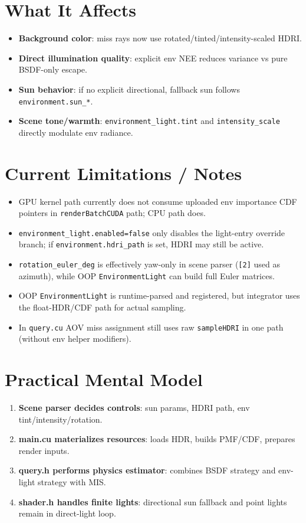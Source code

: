 \documentclass[11pt]{article}
\begin{document}
\section{What It Affects}
\begin{itemize}[leftmargin=1.5em]
  \item \textbf{Background color}: miss rays now use rotated/tinted/intensity-scaled HDRI.
  \item \textbf{Direct illumination quality}: explicit env NEE reduces variance vs pure BSDF-only escape.
  \item \textbf{Sun behavior}: if no explicit directional, fallback sun follows \verb|environment.sun_*|.
  \item \textbf{Scene tone/warmth}: \verb|environment_light.tint| and \verb|intensity_scale| directly modulate env radiance.
\end{itemize}

\section{Current Limitations / Notes}
\begin{itemize}[leftmargin=1.5em]
  \item GPU kernel path currently does not consume uploaded env importance CDF pointers in \verb|renderBatchCUDA| path; CPU path does.
  \item \verb|environment_light.enabled=false| only disables the light-entry override branch; if \verb|environment.hdri_path| is set, HDRI may still be active.
  \item \verb|rotation_euler_deg| is effectively yaw-only in scene parser (\verb|[2]| used as azimuth), while OOP \verb|EnvironmentLight| can build full Euler matrices.
  \item OOP \verb|EnvironmentLight| is runtime-parsed and registered, but integrator uses the float-HDR/CDF path for actual sampling.
  \item In \verb|query.cu| AOV miss assignment still uses raw \verb|sampleHDRI| in one path (without env helper modifiers).
\end{itemize}

\section{Practical Mental Model}
\begin{enumerate}[leftmargin=1.5em]
  \item \textbf{Scene parser decides controls}: sun params, HDRI path, env tint/intensity/rotation.
  \item \textbf{main.cu materializes resources}: loads HDR, builds PMF/CDF, prepares render inputs.
  \item \textbf{query.h performs physics estimator}: combines BSDF strategy and env-light strategy with MIS.
  \item \textbf{shader.h handles finite lights}: directional sun fallback and point lights remain in direct-light loop.
\end{enumerate}
\end{document}
